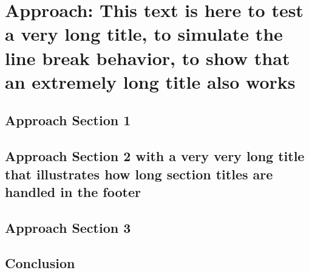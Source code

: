 %
\chapter{Approach: This text is here to test a very long title, to simulate the line break behavior, to show that an extremely long title also works}
\label{sec:approach}

\Blindtext[2][1]

\section{Approach Section 1}
\label{sec:approach:sec1}

\Blindtext[2][2]

\section{Approach Section 2 with a very very long title that illustrates how long section titles are handled in the footer}
\label{sec:approach:sec2}

\Blindtext[3][2]

\section{Approach Section 3}
\label{sec:approach:sec3}

\Blindtext[4][2]

\section{Conclusion}
\label{sec:approach:conclusion}

\Blindtext[2][1]